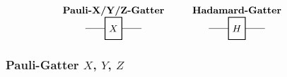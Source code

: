 

\newcommand{\gatterbox}[1]{%
  \tikz[baseline=-0.5ex]{
    \draw[-] (-1,0) -- (-0.3,0);
    \draw[thick] (-0.3,-0.4) rectangle (0.3,0.4);
    \node at (0,0) {\( #1 \)};
    \draw[-] (0.3,0) -- (1,0);
  }%
}
\[
\begin{array}{c@{\hspace{1cm}}c@{\hspace{1cm}}c}
\textbf{Pauli-X/Y/Z-Gatter} & \textbf{Hadamard-Gatter}\\
\gatterbox{X} & \gatterbox{H} 
\end{array}
\]


\subsubsection{Pauli-Gatter $X$, $Y$, $Z$}\label{subsec:pauli_gatter}

